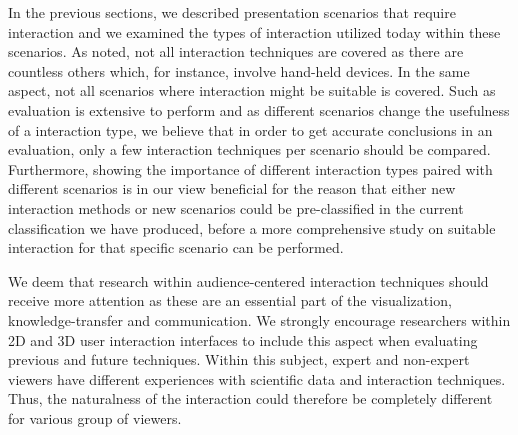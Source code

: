 \documentclass[review,journal]{vgtc}         %
\begin{document}
In the previous sections, we described presentation scenarios that require interaction and we examined the types of interaction utilized today within these scenarios.
As noted, not all interaction techniques are covered as there are countless others which, for instance, involve hand-held devices.
In the same aspect, not all scenarios where interaction might be suitable is covered.
Such as evaluation is extensive to perform and as different scenarios change the usefulness of a interaction type, we believe that in order to get accurate conclusions in an evaluation, only a few interaction techniques per scenario should be compared.
Furthermore, showing the importance of different interaction types paired with different scenarios is in our view beneficial for the reason that either new interaction methods or new scenarios could be pre-classified in the current classification we have produced, before a more comprehensive study on suitable interaction for that specific scenario can be performed.

We deem that research within audience-centered interaction techniques should receive more attention as these are an essential part of the visualization, knowledge-transfer and communication. 
We strongly encourage researchers within 2D and 3D user interaction interfaces to include this aspect when evaluating previous and future techniques.
Within this subject, expert and non-expert viewers have different experiences with scientific data and interaction techniques. Thus, the naturalness of the interaction could therefore be completely different for various group of viewers.


\end{document}
